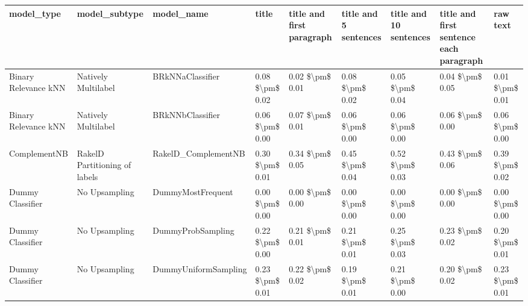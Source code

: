 \begin{tabular}{lllllllll}
\toprule
                     model\_type &                 model\_subtype &                                   model\_name &           title & title and first paragraph & title and 5 sentences & title and 10 sentences & title and first sentence each paragraph &            raw text \\
\midrule
           Binary Relevance kNN &           Natively Multilabel &                             BRkNNaClassifier & 0.08 \$\textbackslash pm\$ 0.02 &           0.02 \$\textbackslash pm\$ 0.01 &       0.08 \$\textbackslash pm\$ 0.02 &        0.05 \$\textbackslash pm\$ 0.04 &                         0.04 \$\textbackslash pm\$ 0.05 &     0.01 \$\textbackslash pm\$ 0.01 \\
           Binary Relevance kNN &           Natively Multilabel &                             BRkNNbClassifier & 0.06 \$\textbackslash pm\$ 0.00 &           0.07 \$\textbackslash pm\$ 0.01 &       0.06 \$\textbackslash pm\$ 0.00 &        0.06 \$\textbackslash pm\$ 0.00 &                         0.06 \$\textbackslash pm\$ 0.00 &     0.06 \$\textbackslash pm\$ 0.00 \\
                   ComplementNB & RakelD Partitioning of labels &                          RakelD\_ComplementNB & 0.30 \$\textbackslash pm\$ 0.01 &           0.34 \$\textbackslash pm\$ 0.05 &       0.45 \$\textbackslash pm\$ 0.04 &        0.52 \$\textbackslash pm\$ 0.03 &                         0.43 \$\textbackslash pm\$ 0.06 &     0.39 \$\textbackslash pm\$ 0.02 \\
               Dummy Classifier &                 No Upsampling &                            DummyMostFrequent & 0.00 \$\textbackslash pm\$ 0.00 &           0.00 \$\textbackslash pm\$ 0.00 &       0.00 \$\textbackslash pm\$ 0.00 &        0.00 \$\textbackslash pm\$ 0.00 &                         0.00 \$\textbackslash pm\$ 0.00 &     0.00 \$\textbackslash pm\$ 0.00 \\
               Dummy Classifier &                 No Upsampling &                            DummyProbSampling & 0.22 \$\textbackslash pm\$ 0.00 &           0.21 \$\textbackslash pm\$ 0.01 &       0.21 \$\textbackslash pm\$ 0.01 &        0.25 \$\textbackslash pm\$ 0.03 &                         0.23 \$\textbackslash pm\$ 0.02 &     0.20 \$\textbackslash pm\$ 0.01 \\
               Dummy Classifier &                 No Upsampling &                         DummyUniformSampling & 0.23 \$\textbackslash pm\$ 0.01 &           0.22 \$\textbackslash pm\$ 0.02 &       0.19 \$\textbackslash pm\$ 0.01 &        0.21 \$\textbackslash pm\$ 0.00 &                         0.20 \$\textbackslash pm\$ 0.02 &     0.23 \$\textbackslash pm\$ 0.01 \\

\end{tabular}
